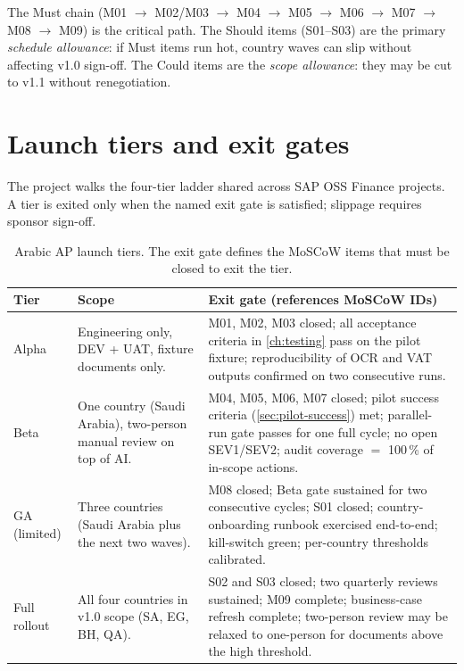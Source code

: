 \documentclass[11pt,a4paper,twoside]{report}
\begin{document}
\noindent
The Must chain (M01 $\to$ M02/M03 $\to$ M04 $\to$ M05 $\to$ M06 $\to$
M07 $\to$ M08 $\to$ M09) is the critical path. The Should items
(S01--S03) are the primary \emph{schedule allowance}: if Must items
run hot, country waves can slip without affecting v1.0 sign-off. The
Could items are the \emph{scope allowance}: they may be cut to v1.1
without renegotiation.

\section{Launch tiers and exit gates}\label{sec:ap-launch-tiers}

The project walks the four-tier ladder shared across SAP OSS Finance
projects. A tier is exited only when the named exit gate is satisfied;
slippage requires sponsor sign-off.

\begin{table}[htbp]
\centering
\caption{Arabic AP launch tiers. The exit gate defines the MoSCoW
items that must be closed to exit the tier.}
\label{tab:ap-launch-tiers}
\footnotesize
\begin{tabularx}{\linewidth}{@{}l l X@{}}
\toprule
\textbf{Tier} & \textbf{Scope} & \textbf{Exit gate (references MoSCoW IDs)} \\ \midrule
Alpha & Engineering only, DEV + UAT, fixture documents only. & M01, M02, M03 closed; all acceptance criteria in \cref{ch:testing} pass on the pilot fixture; reproducibility of OCR and VAT outputs confirmed on two consecutive runs. \\
Beta  & One country (Saudi Arabia), two-person manual review on top of AI. & M04, M05, M06, M07 closed; pilot success criteria (\cref{sec:pilot-success}) met; parallel-run gate passes for one full cycle; no open SEV1/SEV2; audit coverage $=$ 100\,\% of in-scope actions. \\
GA (limited) & Three countries (Saudi Arabia plus the next two waves). & M08 closed; Beta gate sustained for two consecutive cycles; S01 closed; country-onboarding runbook exercised end-to-end; kill-switch green; per-country thresholds calibrated. \\
Full rollout & All four countries in v1.0 scope (SA, EG, BH, QA). & S02 and S03 closed; two quarterly reviews sustained; M09 complete; business-case refresh complete; two-person review may be relaxed to one-person for documents above the high threshold. \\
\bottomrule
\end{tabularx}
\end{table}
\end{document}
